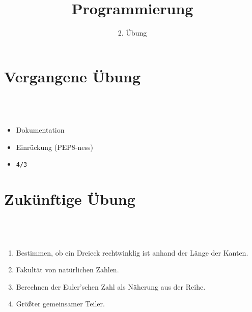 
\title{Programmierung}
\subtitle{2. Übung}

\newcommand{\s}{\textvisiblespace}
\newcommand{\bs}{\s\s\s\s}


    \begin{frame}
        \frontframe
    \end{frame}

    \section{Vergangene Übung}
    \subsection{~}

    \begin{frame}
        \begin{itemize}
        \item Dokumentation
        \pause
        \item Einrückung (PEP8-ness)
        \pause
        \item \texttt{4/3}
        \end{itemize}
    \end{frame}

    \section{Zukünftige Übung}
    \subsection{~}

    \begin{frame}
        \begin{enumerate}
        \item Bestimmen, ob ein Dreieck rechtwinklig ist anhand der Länge der
            Kanten.
        \item Fakultät von natürlichen Zahlen.
        \item Berechnen der Euler'schen Zahl als Näherung aus der Reihe.
        \item Größter gemeinsamer Teiler.
        \end{enumerate}
    \end{frame}


